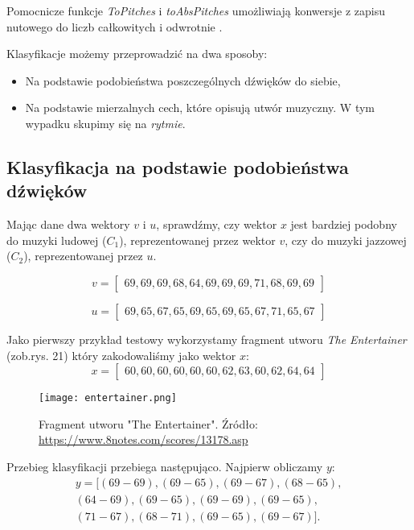 Pomocnicze funkcje \textit{ToPitches} i \textit{toAbsPitches} umożliwiają konwersje z  zapisu nutowego do liczb całkowitych i odwrotnie \citep[s. 60]{HSOM_2018}.

Klasyfikacje możemy przeprowadzić na dwa sposoby:
\begin{itemize}
    \item Na podstawie podobieństwa poszczególnych dźwięków do siebie,
    \item Na podstawie mierzalnych cech, które opisują utwór muzyczny. W tym wypadku skupimy się na \textit{rytmie}.
\end{itemize}

\subsection{Klasyfikacja na podstawie podobieństwa dźwięków}
Mając dane dwa wektory $v$ i $u$, sprawdźmy, czy wektor $x$ jest bardziej podobny do muzyki ludowej ($C_{1}$), reprezentowanej przez wektor $v$, czy do muzyki jazzowej ($C_{2}$), reprezentowanej przez $u$. 

\begin{equation*}
v =
\begin{bmatrix}
69,69,69,68,64,69,69,69,71,68,69,69
\end{bmatrix}
\end{equation*}

\begin{equation*}
    u =
    \begin{bmatrix}
    69,65,67,65,69,65,69,65,67,71,65,67
    \end{bmatrix}
\end{equation*}

Jako pierwszy przykład testowy wykorzystamy fragment utworu \textit{The Entertainer} (zob.rys. 21) który zakodowaliśmy jako wektor $x$:
\begin{equation*}
x =
    \begin{bmatrix}
   60,60,60,60,60,60,62,63,60,62,64,64
    \end{bmatrix}
\end{equation*}

\begin{figure}[H]
\texttt{[image: entertainer.png]}
\centering
\caption{Fragment utworu "The Entertainer". Źródło: \url{https://www.8notes.com/scores/13178.asp}}
\centering
\end{figure}

Przebieg klasyfikacji przebiega następująco. Najpierw obliczamy $y$:
\begin{align*}
y = [(69 - 69), (69 - 65), (69 - 67), (68 - 65), \\ (64 - 69), 
(69 - 65), (69 - 69), (69 - 65),\\ (71 - 67), (68 - 71), (69 - 65), (69 - 67)].
\end{align*}

